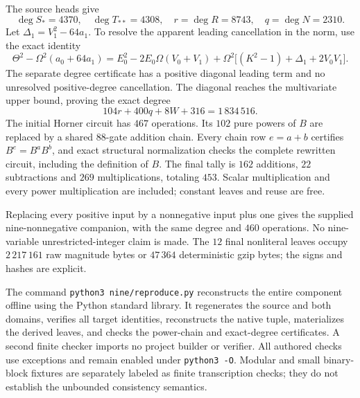 The source heads give
\[
 \deg S_*=4370,\quad\deg T_{**}=4308,
 \quad r=\deg R=8743,\quad q=\deg N=2310.
\]
Let $\Delta_1=V_1^2-64a_1$.  To resolve the apparent leading cancellation
in the norm, use the exact identity
\[
 \Theta^2-\Omega^2(a_0+64a_1)
 =E_0^2-2E_0\Omega(V_0+V_1)
  +\Omega^2\bigl[(K^2-1)+\Delta_1+2V_0V_1\bigr].
\]
The separate degree certificate has a positive diagonal leading term and
no unresolved positive-degree cancellation.  The diagonal reaches the
multivariate upper bound, proving the exact degree
\[
 104r+400q+8W+316=1\,834\,516.
\]
The initial Horner circuit has $467$ operations.  Its $102$ pure powers of
$B$ are replaced by a shared $88$-gate addition chain.  Every chain row
$e=a+b$ certifies $B^e=B^aB^b$, and exact structural normalization checks
the complete rewritten circuit, including the definition of $B$.  The
final tally is $162$ additions, $22$ subtractions and $269$
multiplications, totaling $453$.  Scalar multiplication and every power
multiplication are included; constant leaves and reuse are free.

Replacing every positive input by a nonnegative input plus one gives the
supplied nine-nonnegative companion, with the same degree and $460$
operations.  No nine-variable unrestricted-integer claim is made.
The $12$ final nonliteral leaves occupy $2\,217\,161$ raw magnitude bytes
or $47\,364$ deterministic gzip bytes; the signs and hashes are explicit.

The command \texttt{python3 nine/reproduce.py} reconstructs the entire
component offline using the Python standard library.  It regenerates the
source and both domains, verifies all target identities, reconstructs the
native tuple, materializes the derived leaves, and checks the power-chain
and exact-degree certificates.  A second finite checker imports no
project builder or verifier.  All authored checks use exceptions and
remain enabled under \texttt{python3 -O}.  Modular and small binary-block
fixtures are separately labeled as finite transcription checks; they do
not establish the unbounded consistency semantics.
